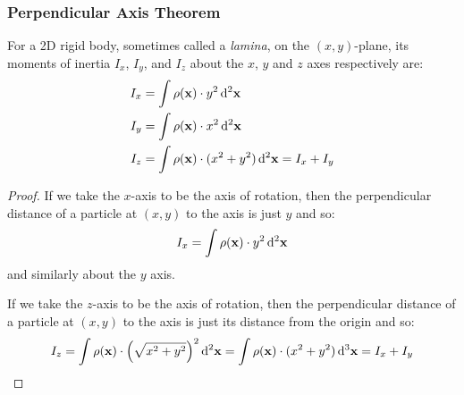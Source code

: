 \documentclass[../main.tex]{subfiles}
\begin{document}
\subsubsection{Perpendicular Axis Theorem}
\begin{lemma}
  For a 2D rigid body, sometimes called a \textit{lamina}, on the $(x, y)$-plane, its moments of inertia $I_x$, $I_y$, and $I_z$ about the $x$, $y$ and $z$ axes respectively are:
  \begin{align*}
    I_x &= \int \rho(\vec{x}) \cdot y^2 \d^2{\vec{x}} \\
    I_y &= \int \rho(\vec{x}) \cdot x^2 \d^2{\vec{x}} \\
    I_z &= \int \rho(\vec{x}) \cdot (x^2 + y^2) \d^2{\vec{x}} = I_x + I_y
  \end{align*}
\end{lemma}
\begin{proof}
  If we take the $x$-axis to be the axis of rotation, then the perpendicular distance of a particle at $(x, y)$ to the axis is just $y$ and so:
  \[
    I_x = \int \rho(\vec{x}) \cdot y^2 \d^2{\vec{x}}
  \]
  and similarly about the $y$ axis.

  If we take the $z$-axis to be the axis of rotation, then the perpendicular distance of a particle at $(x, y)$ to the axis is just its distance from the origin and so:
  \[
    I_z = \int \rho(\vec{x}) \cdot \left(\sqrt{x^2 + y^2}\right)^2 \d^2{\vec{x}} = \int \rho(\vec{x}) \cdot (x^2 + y^2) \d^3{\vec{x}} = I_x + I_y
  \]
\end{proof}
\end{document}
